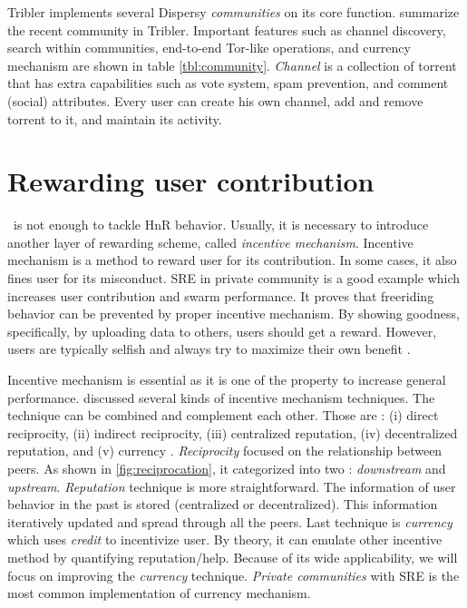 Tribler implements several Dispersy \textit{communities} on its core function. \citeauthor{2016:tribler-techdebt:vos} summarize the recent community in Tribler. Important features such as channel discovery, search within communities, end-to-end Tor-like operations, and currency mechanism are shown in table \ref{tbl:community}. \textit{Channel} is a collection of torrent that has extra capabilities such as vote system, spam prevention, and comment (social) attributes. Every user can create his own channel, add and remove torrent to it, and maintain its activity. 

\section{Rewarding user contribution}
\label{sec:userreward}

\bt~is not enough to tackle HnR behavior. Usually, it is necessary to introduce another layer of rewarding scheme, called \textit{incentive mechanism}. Incentive mechanism is a method to reward user for its contribution. In some cases, it also fines user for its misconduct. SRE in private community is a good example which increases user contribution and swarm performance. It proves that freeriding behavior can be prevented by proper incentive mechanism. By showing goodness, specifically, by uploading data to others, users should get a reward. However, users are typically selfish and always try to maximize their own benefit \cite{2015:incentivep2pgame:kang}.

Incentive mechanism is essential as it is one of the property to increase general performance. \citeauthor{2011:managesupplydemand:meulpolder} discussed several kinds of incentive mechanism techniques. The technique can be combined and complement each other. Those are : (i) direct reciprocity, (ii) indirect reciprocity, (iii) centralized reputation, (iv) decentralized reputation, and (v) currency \cite{2011:managesupplydemand:meulpolder}. \textit{Reciprocity} focused on the relationship between peers. As shown in \ref{fig:reciprocation}, it categorized into two : \textit{downstream} and \textit{upstream}. \textit{Reputation} technique is more straightforward. The information of user behavior in the past is stored (centralized or decentralized). This information iteratively updated and spread through all the peers. Last technique is \textit{currency} which uses \textit{credit} to incentivize user. By theory, it can emulate other incentive method by quantifying reputation/help. Because of its wide applicability, we will focus on improving the \textit{currency} technique.  \textit{Private communities} with SRE is the most common implementation of currency mechanism. 

